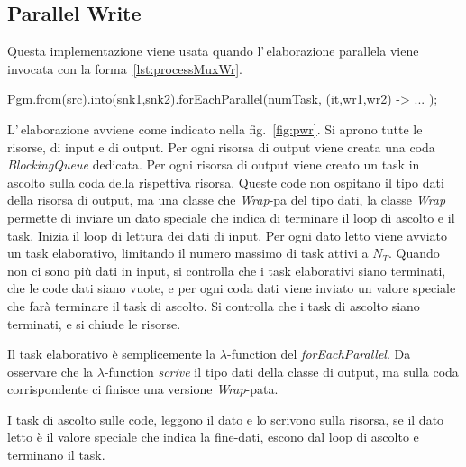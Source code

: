 \subsection{Parallel Write} \label{sec:pwr}
Questa implementazione viene usata quando l'\,elaborazione parallela viene
invocata con la forma~\ref{lst:processMuxWr}.
\begin{elisting}[!htb]
\begin{javacode}
Pgm.from(src).into(snk1,snk2).forEachParallel(numTask, (it,wr1,wr2) -> { ... });
\end{javacode}
\caption{elaborazione $1,W_1,\dots,W_N$ (PMW)}
\label{lst:processMuxWr}
\end{elisting}
L'\,ela\-bo\-ra\-zio\-ne avviene come indicato nella fig.~\ref{fig:pwr}.
Si aprono tutte le risorse, di input e di output.
Per ogni risorsa di output viene creata una coda \textsl{Block\-ing\-Que\-ue}
dedicata.
Per ogni risorsa di output viene creato un task in ascolto sulla coda della
rispettiva risorsa.
Queste code non ospitano il tipo dati della risorsa di output, ma una classe che
\textsl{Wrap}-pa del tipo dati, la classe \textsl{Wrap} permette di inviare un
dato speciale che indica di terminare il loop di ascolto e il task.
Inizia il loop di lettura dei dati di input.
Per ogni dato letto viene avviato un task elaborativo,
limitando il numero massimo di task attivi a $N_T$.
Quando non ci sono più dati in input, si controlla che i task elaborativi
siano terminati, che le code dati siano vuote, e per ogni coda dati viene
inviato un valore speciale che farà terminare il task di ascolto.
Si controlla che i task di ascolto siano terminati, e si chiude le risorse.

Il task elaborativo è semplicemente la $\lambda$-function del
\textsl{forEachParallel}.
Da osservare che la $\lambda$-function \textit{scrive} il tipo dati della classe di
output, ma sulla coda corrispondente ci finisce una versione \textsl{Wrap}-pata.

I task di ascolto sulle code, leggono il dato e lo scrivono sulla risorsa, se il
dato letto è il valore speciale che indica la fine-dati, escono dal loop di
ascolto e terminano il task.

